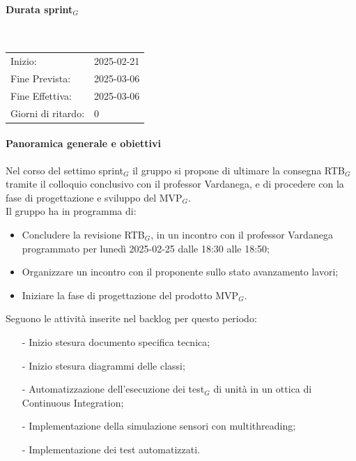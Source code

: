 \documentclass[10pt]{article}
\begin{document}
{{{{{{{        \paragraph{Durata sprint$_G$}\mbox{}\\
        \vspace{-1.5em}
        \begin{table}[h] 
        \renewcommand{\arraystretch}{1.2}  
        \begin{tabular}{ l l }
            Inizio: & 2025-02-21 \\
            Fine Prevista: & 2025-03-06 \\
            Fine Effettiva: & 2025-03-06 \\
            Giorni di ritardo: & 0 \\
        \end{tabular}
        \end{table}
        \vspace{-2em}
        {\renewcommand{\arraystretch}{1.5}%
        
        \paragraph{Panoramica generale e obiettivi}\mbox{}\vspace{0.4em}

        Nel corso del settimo sprint$_G$ il gruppo si propone di ultimare la consegna RTB$_G$ tramite il colloquio conclusivo con il professor 
        Vardanega, e di procedere con la fase di progettazione e sviluppo del MVP$_G$.
        \\
        Il gruppo ha in programma di:
        \begin{itemize}
            \item Concludere la revisione RTB$_G$, in un incontro con il professor Vardanega programmato per lunedì 2025-02-25 dalle 18:30 alle 18:50;
            \item Organizzare un incontro con il proponente sullo stato avanzamento lavori;
            \item Iniziare la fase di progettazione del prodotto MVP$_G$.
        \end{itemize}

        Seguono le attività inserite nel backlog per questo periodo:
        \vspace{-0.5em}
        \begin{itemize}
        \setlength\itemsep{-0.2em}
        \item [-] Inizio stesura documento specifica tecnica;
        \item [-] Inizio stesura diagrammi delle classi;
        \item [-] Automatizzazione dell'esecuzione dei test$_G$ di unità in un ottica di Continuous Integration;
        \item [-] Implementazione della simulazione sensori con multithreading;
        \item [-] Implementazione dei test automatizzati.
        \end{itemize}

}}}}}}}}
\end{document}
